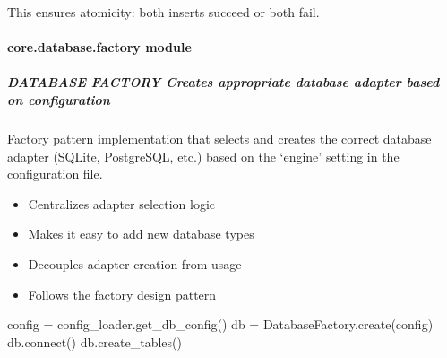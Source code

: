 \documentclass[letterpaper,10pt,english]{sphinxmanual}
\begin{document}
\begin{fulllineitems}
\begin{fulllineitems}
\begin{description}
\begin{description}
\end{description}

\end{description}

\sphinxAtStartPar
This ensures atomicity: both inserts succeed or both fail.

\end{fulllineitems}


\end{fulllineitems}


\sphinxstepscope


\paragraph{core.database.factory module}
\label{\detokenize{core.database.factory:module-core.database.factory}}\label{\detokenize{core.database.factory:core-database-factory-module}}\label{\detokenize{core.database.factory::doc}}

\subparagraph{DATABASE FACTORY \textendash{} Creates appropriate database adapter based on configuration}
\label{\detokenize{core.database.factory:database-factory-creates-appropriate-database-adapter-based-on-configuration}}\begin{description}
\sphinxAtStartPar
Factory pattern implementation that selects and creates the correct
database adapter (SQLite, PostgreSQL, etc.) based on the ‘engine’
setting in the configuration file.

\begin{itemize}
\item {} 
\sphinxAtStartPar
Centralizes adapter selection logic

\item {} 
\sphinxAtStartPar
Makes it easy to add new database types

\item {} 
\sphinxAtStartPar
Decouples adapter creation from usage

\item {} 
\sphinxAtStartPar
Follows the factory design pattern

\end{itemize}

\sphinxAtStartPar
config = config\_loader.get\_db\_config()
db = DatabaseFactory.create(config)
db.connect()
db.create\_tables()

\end{description}
\end{document}
